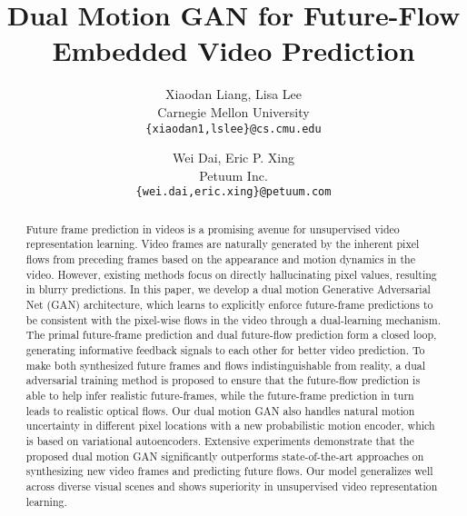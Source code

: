 \documentclass[10pt,twocolumn,letterpaper]{article}
\begin{document}
	
	\title{Dual Motion GAN for Future-Flow Embedded Video Prediction}
	
	\author{Xiaodan Liang, Lisa Lee\\
		Carnegie Mellon University\\
		{\tt\small \{xiaodan1,lslee\}@cs.cmu.edu}
		\and
		Wei Dai, Eric P. Xing\\
		Petuum Inc.\\
		{\tt\small \{wei.dai,eric.xing\}@petuum.com}
	}
	
	\maketitle
	
	
	\begin{abstract}
		Future frame prediction in videos is a promising avenue for unsupervised video representation learning. Video frames are naturally generated by the inherent pixel flows from preceding frames based on the appearance and motion dynamics in the video. However, existing methods focus on directly hallucinating pixel values, resulting in blurry predictions. In this paper, we develop a dual motion Generative Adversarial Net (GAN) architecture, which learns to explicitly enforce future-frame predictions to be consistent with the pixel-wise flows in the video through a dual-learning mechanism. The primal future-frame prediction and dual future-flow prediction form a closed loop, generating informative feedback signals to each other for better video prediction. To make both synthesized future frames and flows indistinguishable from reality, a dual adversarial training method is proposed to ensure that the future-flow prediction is able to help infer realistic future-frames, while the future-frame prediction in turn leads to realistic optical flows. Our dual motion GAN also handles natural motion uncertainty in different pixel locations with a new probabilistic motion encoder, which is based on variational autoencoders. Extensive experiments demonstrate that the proposed dual motion GAN significantly outperforms state-of-the-art approaches on synthesizing new video frames and  predicting future flows. Our model generalizes well across diverse visual scenes and shows superiority in unsupervised video representation learning.
	\end{abstract}
	
\end{document}
